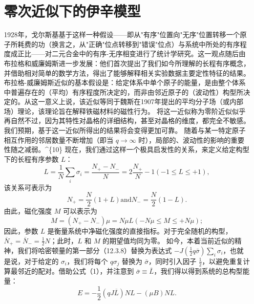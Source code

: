 \section{零次近似下的伊辛模型}\label{ux96f6ux6b21ux8fd1ux4f3cux4e0bux7684ux4f0aux8f9bux6a21ux578b}
1928年，戈尔斯基基于这样一种假设——即从"有序"位置向"无序"位置转移一个原子所耗费的功（换言之，从"正确"位点转移到"错误"位点）与系统中所处的有序程度成正比——对二元合金中的有序-无序相变进行了统计学研究。这一观点随后由布拉格和威廉姆斯进一步发展：他们首次提出了我们如今所理解的长程有序概念，并借助相对简单的数学方法，得出了能够解释相关实验数据主要定性特征的结果。布拉格-威廉姆斯近似的基本假设是：给定体系中单个原子的能量，是由整个体系中普遍存在的（平均）有序程度所决定的，而非由邻近原子的（波动性）构型所决定的。从这一意义上说，该近似等同于魏斯在1907年提出的平均分子场（或内部场）理论，该理论旨在解释铁磁材料的磁性行为。
将这一近似称为零阶近似似乎再自然不过，因为其特性对晶格的详细结构，甚至对晶格的维度，都完全不敏感。我们预期，基于这一近似所得出的结果将会变得更加可靠。
随着与某一特定原子相互作用的邻居数量不断增加（即当 \(q \rightarrow \infty\) 时），局部的、波动性的影响的重要性随之减弱。\^{}\{10\}
现在，我们通过这样一个极具启发性的关系，来定义给定构型下的长程有序参数 \(L\)：
\begin{equation}\tag{12.5.1}\label{eq:12.5.1}
L = \frac { 1 } { N } \sum _ { i } \sigma _ { i } = \frac { N _ { + } - N _ { - } } { N } = 2 \frac { N _ { + } } { N } - 1  ( - 1 \leq L \leq + 1 ) ,
\end{equation}
该关系可表示为
\begin{equation}\tag{12.5.2}\label{eq:12.5.2}
N _ { + } = \frac { N } { 2 } ( 1 + L )  \mathrm { a n d }  N _ { - } = \frac { N } { 2 } ( 1 - L ) .
\end{equation}
由此，磁化强度 \(M\) 可以表示为
\begin{equation}\tag{12.5.3}\label{eq:12.5.3}
M = ( N _ { + } - N _ { - } ) \mu = N \mu L  ( - N \mu \leq M \leq + N \mu ) ;
\end{equation}
因此，参数 \(L\) 是衡量系统中净磁化强度的直接指标。对于完全随机的构型，\(\overline{N}_{+}=\overline{N}_{-}=\frac{1}{2}N\)；此时，\(L\) 和 \(M\) 的期望值均同为零。
如今，本着当前近似的精神，我们将哈密顿量的第一部分（12.3.8）替换为表达式 \(-J(\frac{1}{2}q\bar{\sigma})\sum_{i}\sigma_{i}\)，也就是说，对于给定的 \(\sigma_{i}\)，我们将每个 \(q\sigma_{j}\) 替换为 \(\bar{\sigma}\)，同时引入因子 \(\frac{1}{2}\)，以避免重复计算最邻近的配对。借助公式（1），并注意到 \(\bar{\sigma}\equiv\bar{L}\)，我们得以得到系统的总构型能量：
\begin{equation}\tag{12.5.4}\label{eq:12.5.4}
E = - \frac { 1 } { 2 } \left( q J \overline { { { L } } } \right) N L - ( \mu B ) N L .
\end{equation}
